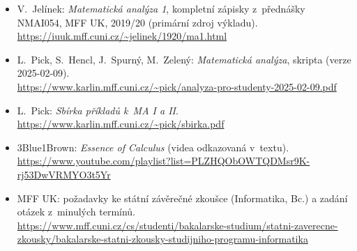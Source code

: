 \documentclass[11pt,a4paper]{article}
\newcommand{\playlist}{https://www.youtube.com/playlist?list=PLZHQObOWTQDMsr9K-rj53DwVRMYO3t5Yr}
\begin{document}
{\raggedright
\begin{itemize}
  \item V.~Jelínek: \emph{Matematická analýza 1}, kompletní zápisky z~přednášky NMAI054, MFF UK, 2019/20 (primární zdroj výkladu).\\ \url{https://iuuk.mff.cuni.cz/~jelinek/1920/ma1.html}
  \item L.~Pick, S.~Hencl, J.~Spurný, M.~Zelený: \emph{Matematická analýza}, skripta (verze 2025-02-09).\\ \url{https://www.karlin.mff.cuni.cz/~pick/analyza-pro-studenty-2025-02-09.pdf}
  \item L.~Pick: \emph{Sbírka příkladů k~MA I a II}.\\ \url{https://www.karlin.mff.cuni.cz/~pick/sbirka.pdf}
  \item 3Blue1Brown: \emph{Essence of Calculus} (videa odkazovaná v~textu).\\ \url{\playlist}
  \item MFF UK: požadavky ke státní závěrečné zkoušce (Informatika, Bc.) a zadání otázek z~minulých termínů.\\ \url{https://www.mff.cuni.cz/cs/studenti/bakalarske-studium/statni-zaverecne-zkousky/bakalarske-statni-zkousky-studijniho-programu-informatika}
\end{itemize}
\par}
\end{document}
